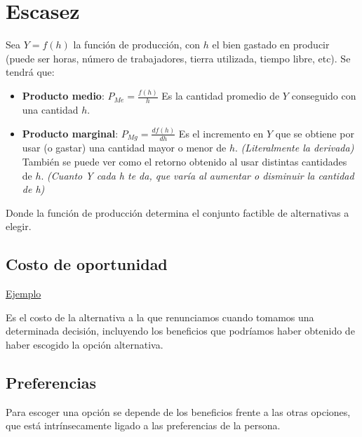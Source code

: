 \section{Escasez}

\newline
\newline
Sea $Y = f(h)$ la función de producción, con $h$ el bien gastado en producir (puede ser horas, número de trabajadores, tierra utilizada, tiempo libre, etc). Se tendrá que:

\begin{itemize}
    \item \textbf{Producto medio}: $P_{Me} = \frac{f(h)}{h}$
    \newline 
    \newline Es la cantidad promedio de $Y$ conseguido con una cantidad $h$.
    \item \textbf{Producto marginal}: $P_{Mg} = \frac{df(h)}{dh}$
    \newline
    \newline Es el incremento en $Y$ que se obtiene por usar (o gastar) una cantidad mayor o menor de $h$. \textit{(Literalmente la derivada)}
    \newline También se puede ver como el retorno obtenido al usar distintas cantidades de $h$. \textit{(Cuanto Y cada h te da, que varía al aumentar o disminuir la cantidad de h)}
\end{itemize}

Donde la función de producción determina el conjunto factible de alternativas a elegir.

\subsection{Costo de oportunidad} 
\hyperlink{ejemplo-Costo de oportunidad}{Ejemplo}

Es el costo de la alternativa a la que renunciamos cuando tomamos una determinada decisión, incluyendo los beneficios que podríamos haber obtenido de haber escogido la opción alternativa. 

\subsection{Preferencias}

Para escoger una opción se depende de los beneficios frente a las otras opciones, que está intrínsecamente ligado a las preferencias de la persona.
\newline

